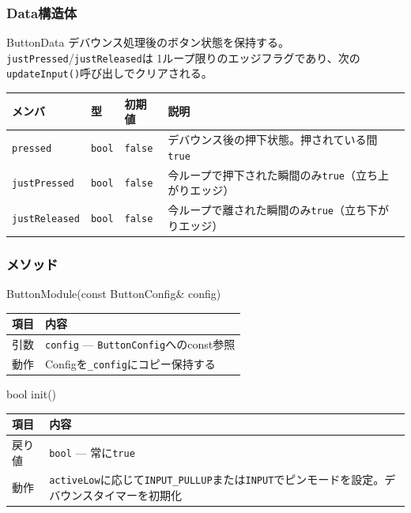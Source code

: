 \subsubsection{Data構造体}

\begin{funcblock}{ButtonData}
デバウンス処理後のボタン状態を保持する。\texttt{justPressed}/\texttt{justReleased}は
1ループ限りのエッジフラグであり、次の\texttt{updateInput()}呼び出しでクリアされる。

\begin{longtable}{l l l p{5.2cm}}
\toprule
\textbf{メンバ} & \textbf{型} & \textbf{初期値} & \textbf{説明} \\
\midrule
\endhead
\texttt{pressed}      & \texttt{bool} & \texttt{false} & デバウンス後の押下状態。押されている間\texttt{true} \\
\texttt{justPressed}  & \texttt{bool} & \texttt{false} & 今ループで押下された瞬間のみ\texttt{true}（立ち上がりエッジ） \\
\texttt{justReleased} & \texttt{bool} & \texttt{false} & 今ループで離された瞬間のみ\texttt{true}（立ち下がりエッジ） \\
\bottomrule
\end{longtable}
\end{funcblock}

\subsubsection{メソッド}

\begin{funcblock}{ButtonModule(const ButtonConfig\& config)}
\begin{tabularx}{\textwidth}{l X}
\toprule
\textbf{項目} & \textbf{内容} \\
\midrule
引数   & \texttt{config} --- \texttt{ButtonConfig}へのconst参照 \\
動作   & Configを\texttt{\_config}にコピー保持する \\
\bottomrule
\end{tabularx}
\end{funcblock}

\begin{funcblock}{bool init()}
\begin{tabularx}{\textwidth}{l X}
\toprule
\textbf{項目} & \textbf{内容} \\
\midrule
戻り値   & \texttt{bool} --- 常に\texttt{true} \\
動作     & \texttt{activeLow}に応じて\texttt{INPUT\_PULLUP}または\texttt{INPUT}でピンモードを設定。デバウンスタイマーを初期化 \\
\bottomrule
\end{tabularx}
\end{funcblock}

